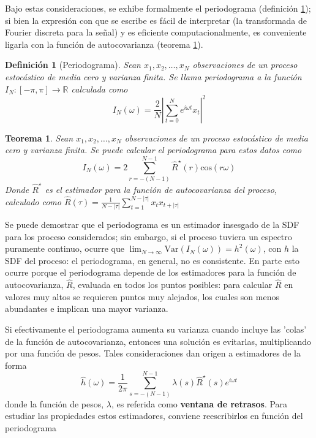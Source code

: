 \documentclass[12pt,a4paper]{mitthesis}
\newtheorem{defn}{Definici\'on}
\newtheorem{thrm}{Teorema}
\newcommand{\R}{\mathbb{R}}
\newcommand{\aste}[1]{\widehat{ #1 }^{\star}}
\newcommand{\est}[1]{\widehat{ #1 }}
\newcommand{\COS}[1]{\mathrm{cos}\left( #1 \right)}
\newcommand{\Var}[1]{\mathrm{Var}\left( #1 \right)}
\newcommand{\abso}[1]{\left| #1 \right|}
\begin{document}
Bajo estas consideraciones, se exhibe formalmente el periodograma (definici\'on 
\ref{periodograma}); si bien la expresi\'on con que se escribe es f\'acil de interpretar (la 
transformada de Fourier discreta para la se\~nal) y es eficiente computacionalmente, es conveniente
ligarla con la funci\'on de autocovarianza (teorema \ref{periodograma_rho}).

\begin{defn}[Periodograma]
Sean $x_1, x_2 , \dots, x_N$ observaciones de un proceso estoc\'astico de media cero y varianza
finita. Se llama periodograma a la funci\'on $I_N: [-\pi,\pi] \rightarrow \R$ calculada como
\begin{equation*}
I_N(\omega) = \frac{2}{N} \abso{ \sum_{t=0}^{N} e^{i \omega t} x_t }^{2}
\end{equation*}
\label{periodograma}
\end{defn}

\begin{thrm}
Sean $x_1, x_2 , \dots, x_N$ observaciones de un proceso estoc\'astico de media cero y varianza
finita. Se puede calcular el periodograma para estos datos como
\begin{equation*}
I_N(\omega) = 2 \sum_{r = -(N-1)}^{N-1} \aste{R}(r) \COS{r \omega}
\end{equation*}
Donde $\aste{R}$ es el estimador para la funci\'on de autocovarianza del proceso, calculado como
$\widehat{R}(\tau) = \frac{1}{N-\abso{\tau}} \sum_{t = 1}^{N-\abso{\tau}} x_t x_{t+\abso{\tau}}$
\label{periodograma_rho}
\end{thrm}

Se puede demostrar que el periodograma es un estimador insesgado de la SDF para los proceso 
considerados; sin embargo, si el proceso tuviera un espectro puramente continuo, ocurre que 
$\lim_{N\rightarrow \infty} \Var{I_N(\omega)} = h^{2}(\omega)$, con $h$ la SDF del proceso: el 
periodograma, en general, no es consistente.
En parte esto ocurre porque el periodograma depende de los estimadores para la funci\'on de 
autocovarianza, $\est{R}$, evaluada en todos los puntos posibles: para calcular $\est{R}$ en 
valores muy altos se requieren puntos muy alejados, los cuales son menos abundantes e implican 
una mayor varianza.

Si efectivamente el periodograma aumenta su varianza cuando incluye las 'colas' de la funci\'on de 
autocovarianza, entonces una soluci\'on es evitarlas, multiplicando por una funci\'on de pesos. 
Tales consideraciones dan origen a estimadores de la forma
\begin{equation*}
\est{h}(\omega) = \frac{1}{2\pi} \sum_{s = -(N-1)}^{N-1} 
\lambda(s) \aste{R}(s) e^{i \omega t}
\label{ventaneando}
\end{equation*}
donde la funci\'on de pesos, $\lambda$, es referida como \textbf{ventana de retrasos}. Para 
estudiar las propiedades estos estimadores, conviene reescribirlos en funci\'on del periodograma
\end{document}
